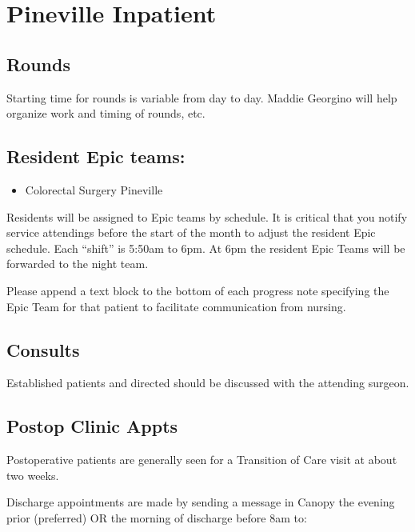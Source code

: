 \documentclass[
]{book}
\providecommand{\tightlist}{%
  \setlength{\itemsep}{0pt}\setlength{\parskip}{0pt}}
\begin{document}
\hypertarget{pineville-inpatient}{%
\chapter{Pineville Inpatient}\label{pineville-inpatient}}

\hypertarget{rounds-1}{%
\section{Rounds}\label{rounds-1}}

Starting time for rounds is variable from day to day. Maddie Georgino will help organize work and timing of rounds, etc.

\hypertarget{resident-epic-teams-1}{%
\section{Resident Epic teams:}\label{resident-epic-teams-1}}

\begin{itemize}
\tightlist
\item
  Colorectal Surgery Pineville
\end{itemize}

Residents will be assigned to Epic teams by schedule. It is critical that you notify service attendings before the start of the month to adjust the resident Epic schedule. Each ``shift'' is 5:50am to 6pm. At 6pm the resident Epic Teams will be forwarded to the night team.

Please append a text block to the bottom of each progress note specifying the Epic Team for that patient to facilitate communication from nursing.

\hypertarget{consults-1}{%
\section{Consults}\label{consults-1}}

Established patients and directed should be discussed with the attending surgeon.

\hypertarget{postop-clinic-appts}{%
\section{Postop Clinic Appts}\label{postop-clinic-appts}}

Postoperative patients are generally seen for a Transition of Care visit at about two weeks.

Discharge appointments are made by sending a message in Canopy the evening prior (preferred) OR the morning of discharge before 8am to:
\end{document}

